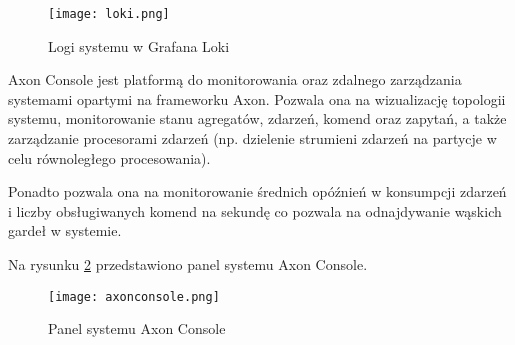 \begin{figure}[!h]
    \centering \texttt{[image: loki.png]}
    \caption{Logi systemu w Grafana Loki}
    \label{fig:loki}
\end{figure}

Axon Console jest platformą do monitorowania oraz zdalnego zarządzania systemami opartymi na frameworku Axon. Pozwala ona na wizualizację topologii systemu, monitorowanie stanu agregatów, zdarzeń, komend oraz zapytań, a także zarządzanie procesorami zdarzeń (np. dzielenie strumieni zdarzeń na partycje w celu równoległego procesowania).

Ponadto pozwala ona na monitorowanie średnich opóźnień w konsumpcji zdarzeń i liczby obsługiwanych komend na sekundę co pozwala na odnajdywanie wąskich gardeł w systemie.

Na rysunku \ref{fig:axonconsole} przedstawiono panel systemu Axon Console.

\begin{figure}[!h]
    \centering \texttt{[image: axonconsole.png]}
    \caption{Panel systemu Axon Console}
    \label{fig:axonconsole}
\end{figure}
